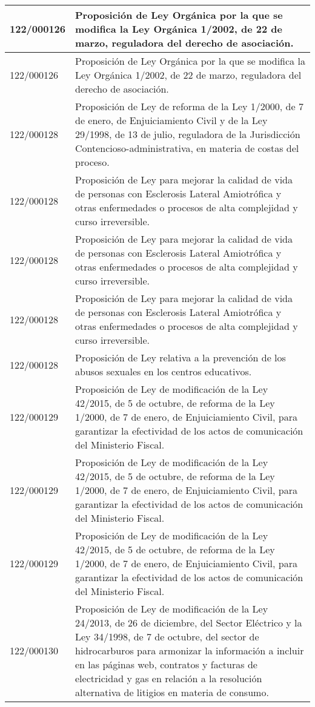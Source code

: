{\begin{table}[H]
\begin{center}
\begin{tabularx}{\linewidth}{| l | X |}
\hline
122/000126 & Proposición de Ley Orgánica por la que se modifica la Ley Orgánica 1/2002, de 22 de marzo, reguladora del derecho de asociación. \\
\hline
122/000126 & Proposición de Ley Orgánica por la que se modifica la Ley Orgánica 1/2002, de 22 de marzo, reguladora del derecho de asociación. \\
\hline
122/000128 & Proposición de Ley de reforma de la Ley 1/2000, de 7 de enero, de Enjuiciamiento Civil y de la Ley 29/1998, de 13 de julio, reguladora de la Jurisdicción Contencioso-administrativa, en materia de costas del proceso. \\
\hline
122/000128 & Proposición de Ley para mejorar la calidad de vida de personas con Esclerosis Lateral Amiotrófica y otras enfermedades o procesos de alta complejidad y curso irreversible. \\
\hline
122/000128 & Proposición de Ley para mejorar la calidad de vida de personas con Esclerosis Lateral Amiotrófica y otras enfermedades o procesos de alta complejidad y curso irreversible. \\
\hline
122/000128 & Proposición de Ley para mejorar la calidad de vida de personas con Esclerosis Lateral Amiotrófica y otras enfermedades o procesos de alta complejidad y curso irreversible. \\
\hline
122/000128 & Proposición de Ley relativa a la prevención de los abusos sexuales en los centros educativos. \\
\hline
122/000129 & Proposición de Ley de modificación de la Ley 42/2015, de 5 de octubre, de reforma de la Ley 1/2000, de 7 de enero, de Enjuiciamiento Civil, para garantizar la efectividad de los actos de comunicación del Ministerio Fiscal. \\
\hline
122/000129 & Proposición de Ley de modificación de la Ley 42/2015, de 5 de octubre, de reforma de la Ley 1/2000, de 7 de enero, de Enjuiciamiento Civil, para garantizar la efectividad de los actos de comunicación del Ministerio Fiscal. \\
\hline
122/000129 & Proposición de Ley de modificación de la Ley 42/2015, de 5 de octubre, de reforma de la Ley 1/2000, de 7 de enero, de Enjuiciamiento Civil, para garantizar la efectividad de los actos de comunicación del Ministerio Fiscal. \\
\hline
122/000130 & Proposición de Ley de modificación de la Ley 24/2013, de 26 de diciembre, del Sector Eléctrico y la Ley 34/1998, de 7 de octubre, del sector de hidrocarburos para armonizar la información a incluir en las páginas web, contratos y facturas de electricidad y gas en relación a la resolución alternativa de litigios en materia de consumo. \\

\end{tabularx}
\end{center}
\end{table}}
